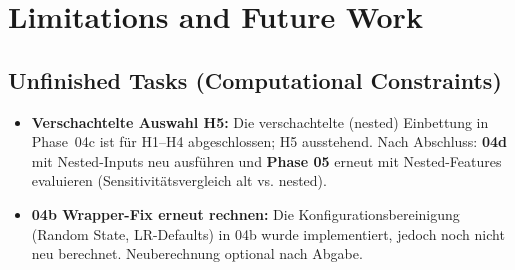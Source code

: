 \chapter{Limitations and Future Work}
\label{chap:future-work}

\section{Unfinished Tasks (Computational Constraints)}
\begin{itemize}
  \item \textbf{Verschachtelte Auswahl H5:} Die verschachtelte (nested) Einbettung in Phase~04c ist für H1--H4 abgeschlossen; H5 ausstehend. Nach Abschluss: \textbf{04d} mit Nested-Inputs neu ausführen und \textbf{Phase 05} erneut mit Nested-Features evaluieren (Sensitivitätsvergleich alt vs. nested).
  \item \textbf{04b Wrapper-Fix erneut rechnen:} Die Konfigurationsbereinigung (Random State, LR-Defaults) in 04b wurde implementiert, jedoch noch nicht neu berechnet. Neuberechnung optional nach Abgabe.
\end{itemize}

